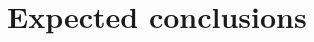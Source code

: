 \documentclass{hogent-article}
\begin{document}
\section{Expected conclusions}


\lipsum[14-18]


\printbibliography[heading=bibintoc]
\end{document}
